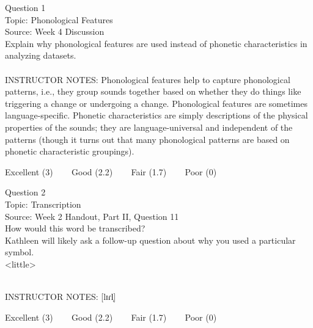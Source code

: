 \documentclass[12pt]{article}
\begin{document}
{\large Question 1}\\

Topic: Phonological Features\\
Source: Week 4 Discussion\\

Explain why phonological features are used instead of phonetic characteristics in analyzing datasets.\\


~\\
INSTRUCTOR NOTES: Phonological features help to capture phonological patterns, i.e., they group sounds together based on whether they do things like triggering a change or undergoing a change. Phonological features are sometimes language-specific. Phonetic characteristics are simply descriptions of the physical properties of the sounds; they are language-universal and independent of the patterns (though it turns out that many phonological patterns are based on phonetic characteristic groupings).


\vfill
Excellent (3) ~~~ Good (2.2) ~~~ Fair (1.7) ~~~ Poor (0)
\newpage

{\large Question 2}\\

Topic: Transcription\\
Source: Week 2 Handout, Part II, Question 11\\

How would this word be transcribed?\\ Kathleen will likely ask a follow-up question about why you used a particular symbol.\\

<little>


~\\
INSTRUCTOR NOTES: [lɪɾl̩]


\vfill
Excellent (3) ~~~ Good (2.2) ~~~ Fair (1.7) ~~~ Poor (0)
\newpage

\begin{center}
\textbf{{\color{red}{\HUGE END OF EXAM}}}\\

\end{center}
\newpage

\begin{center}
\textbf{{\color{blue}{\HUGE START OF EXAM\\}}}

\textbf{{\color{blue}{\HUGE Student ID: 74431\\}}}

\textbf{{\color{blue}{\HUGE 9:50\\}}}

\end{center}
\newpage
\end{document}
